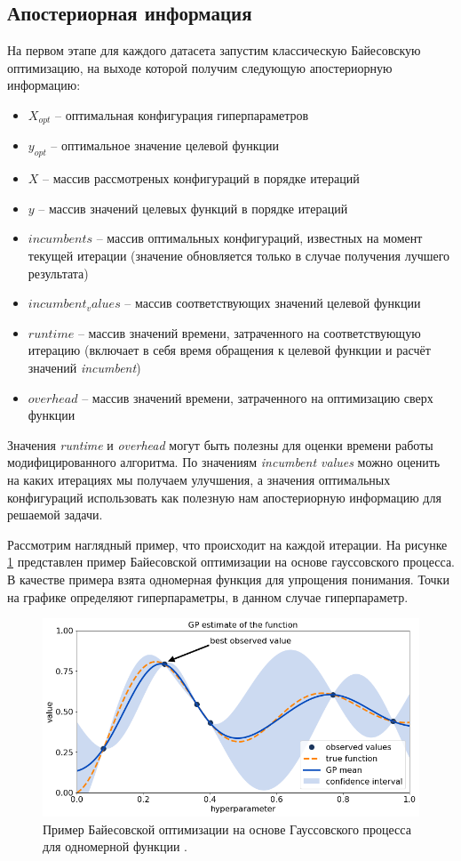 \documentclass[times,specification,annotation]{itmo-student-thesis}
\begin{document}
	\subsection{Апостериорная информация} 
	На первом этапе для каждого датасета запустим классическую Байесовскую оптимизацию, на выходе которой получим следующую апостериорную информацию: 
	\begin{itemize}
		\item $ X_{opt} $ -- оптимальная конфигурация гиперпараметров
		\item $ y_{opt} $ -- оптимальное значение целевой функции
		\item $ X $ -- массив рассмотреных конфигураций в порядке итераций
		\item $ y $ -- массив значений целевых функций в порядке итераций
		\item $ incumbents $ -- массив оптимальных конфигураций, известных на момент текущей итерации (значение обновляется только в случае получения лучшего результата)
		\item $ incumbent_values $ -- массив соответствующих значений целевой функции
		\item $ runtime $ -- массив значений времени, затраченного на соответствующую итерацию (включает в себя время обращения к целевой функции и расчёт значений \textit{incumbent})
		\item $ overhead $ -- массив значений времени, затраченного на оптимизацию сверх функции
	\end{itemize}
	Значения \textit{runtime} и \textit{overhead} могут быть полезны для оценки времени работы модифицированного алгоритма. По значениям \textit{incumbent values} можно оценить на каких итерациях мы получаем улучшения, а значения оптимальных конфигураций использовать как полезную нам апостериорную информацию для решаемой задачи. \par 
	Рассмотрим наглядный пример, что происходит на каждой итерации. На рисунке \ref{img:bogp} представлен пример Байесовской оптимизации на основе гауссовского процесса. В качестве примера взята одномерная функция для упрощения понимания. Точки на графике определяют гиперпараметры, в данном случае гиперпараметр. 
	\begin{figure}[!ht]
		\caption{Пример Байесовской оптимизации на основе Гауссовского процесса для одномерной функции \cite{kiss2019bayesian}.}\label{img:bogp}
		\includegraphics[width=0.85\linewidth]{bo_gp}
		\centering
	\end{figure}
\end{document}
